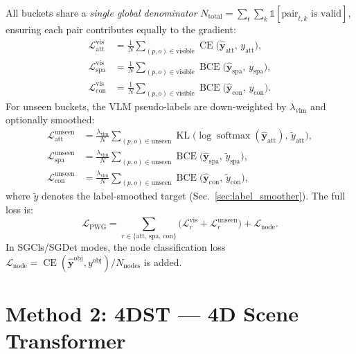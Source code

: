 \documentclass[runningheads]{llncs}
\newcommand{\op}[1]{\operatorname{#1}}
\newcommand{\mat}[1]{\bm{#1}}
\begin{document}
All buckets share a \emph{single global denominator} $N_{\text{total}} = \sum_{t}\sum_k \mathbb{1}[\text{pair}_{t,k} \text{ is valid}]$, ensuring each pair contributes equally to the gradient:
\begin{align}
    \mathcal{L}_{\text{att}}^{\text{vis}} &= \frac{1}{N}\sum_{(p,o) \in \text{visible}} \op{CE}\bigl(\hat{\mat{y}}_{\text{att}},\, y_{\text{att}}\bigr), \label{eq:pwg_att_vis} \\
    \mathcal{L}_{\text{spa}}^{\text{vis}} &= \frac{1}{N}\sum_{(p,o) \in \text{visible}} \op{BCE}\bigl(\hat{\mat{y}}_{\text{spa}},\, y_{\text{spa}}\bigr), \label{eq:pwg_spa_vis} \\
    \mathcal{L}_{\text{con}}^{\text{vis}} &= \frac{1}{N}\sum_{(p,o) \in \text{visible}} \op{BCE}\bigl(\hat{\mat{y}}_{\text{con}},\, y_{\text{con}}\bigr). \label{eq:pwg_con_vis}
\end{align}
For unseen buckets, the VLM pseudo-labels are down-weighted by $\lambda_{\text{vlm}}$ and optionally smoothed:
\begin{align}
    \mathcal{L}_{\text{att}}^{\text{unseen}} &= \frac{\lambda_{\text{vlm}}}{N}\sum_{(p,o) \in \text{unseen}} \op{KL}\bigl(\log\op{softmax}(\hat{\mat{y}}_{\text{att}}),\, \tilde{y}_{\text{att}}\bigr), \label{eq:pwg_att_unseen} \\
    \mathcal{L}_{\text{spa}}^{\text{unseen}} &= \frac{\lambda_{\text{vlm}}}{N}\sum_{(p,o) \in \text{unseen}} \op{BCE}\bigl(\hat{\mat{y}}_{\text{spa}},\, \tilde{y}_{\text{spa}}\bigr), \label{eq:pwg_spa_unseen} \\
    \mathcal{L}_{\text{con}}^{\text{unseen}} &= \frac{\lambda_{\text{vlm}}}{N}\sum_{(p,o) \in \text{unseen}} \op{BCE}\bigl(\hat{\mat{y}}_{\text{con}},\, \tilde{y}_{\text{con}}\bigr), \label{eq:pwg_con_unseen}
\end{align}
where $\tilde{y}$ denotes the label-smoothed target (Sec.~\ref{sec:label_smoother}).  The full loss is:
\begin{equation}
    \mathcal{L}_{\text{PWG}} = \sum_{r \in \{\text{att, spa, con}\}} \bigl(\mathcal{L}_{r}^{\text{vis}} + \mathcal{L}_{r}^{\text{unseen}}\bigr) + \mathcal{L}_{\text{node}}.
    \label{eq:pwg_total}
\end{equation}
In SGCls/SGDet modes, the node classification loss $\mathcal{L}_{\text{node}} = \op{CE}(\hat{\mat{y}}^{\text{obj}}, y^{\text{obj}}) / N_{\text{nodes}}$ is added.


\section{Method 2: 4DST --- 4D Scene Transformer}
\label{sec:4dst}
\end{document}

